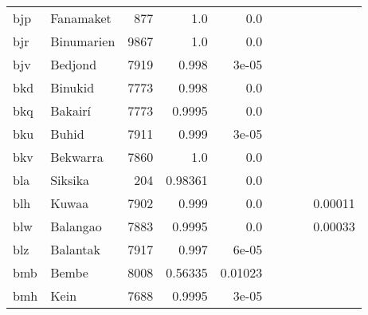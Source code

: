 \documentclass[11pt]{article}
\begin{document}
\begin{table*}[ht]
{\begin{tabular}{llrrrrrrr}
bjp         & Fanamaket         & 877         & 1.0         & 0.0         &          &          &          &          \\

bjr         & Binumarien         & 9867         & 1.0         & 0.0         &          &          &          &          \\

bjv         & Bedjond         & 7919         & 0.998         & 3e-05         &          &          &          &          \\

bkd         & Binukid         & 7773         & 0.998         & 0.0         &          &          &          &          \\

bkq         & Bakairí         & 7773         & 0.9995         & 0.0         &          &          &          &          \\

bku         & Buhid         & 7911         & 0.999         & 3e-05         &          &          &          &          \\

bkv         & Bekwarra         & 7860         & 1.0         & 0.0         &          &          &          &          \\

bla         & Siksika         & 204         & 0.98361         & 0.0         &          &          &          &          \\

blh         & Kuwaa         & 7902         & 0.999         & 0.0         &          &          &          & 0.00011         \\

blw         & Balangao         & 7883         & 0.9995         & 0.0         &          &          &          & 0.00033         \\

blz         & Balantak         & 7917         & 0.997         & 6e-05         &          &          &          &          \\

bmb         & Bembe         & 8008         & 0.56335         & 0.01023         &          &          &          &          \\

bmh         & Kein         & 7688         & 0.9995         & 3e-05         &          &          &          &          \\


\end{tabular}}
\end{table*}
\end{document}

